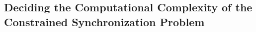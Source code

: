 


 
\subsection{Deciding the Computational Complexity of the Constrained
Synchronization Problem}
\label{sec:decision_procedure}
 

